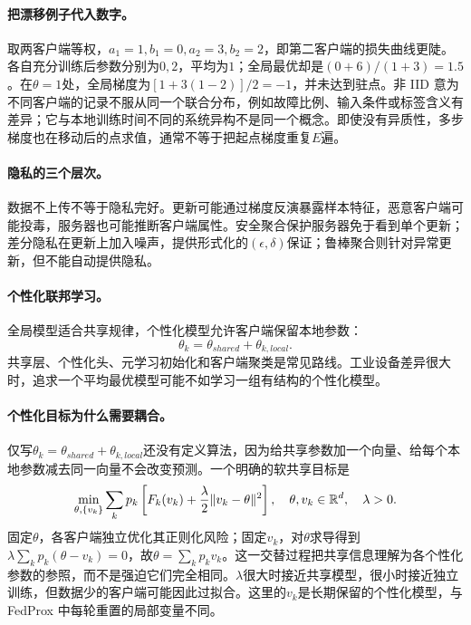 \paragraph{把漂移例子代入数字。}
取两客户端等权，$a_1=1,b_1=0,a_2=3,b_2=2$，即第二客户端的损失曲线更陡。各自充分训练后参数分别为$0,2$，平均为$1$；全局最优却是$(0+6)/(1+3)=1.5$。在$\theta=1$处，全局梯度为$[1+3(1-2)]/2=-1$，并未达到驻点。非 IID 意为不同客户端的记录不服从同一个联合分布，例如故障比例、输入条件或标签含义有差异；它与本地训练时间不同的系统异构不是同一个概念。即使没有异质性，多步梯度也在移动后的点求值，通常不等于把起点梯度重复$E$遍。

\paragraph{隐私的三个层次。}
数据不上传不等于隐私完好。更新可能通过梯度反演暴露样本特征，恶意客户端可能投毒，服务器也可能推断客户端属性。安全聚合保护服务器免于看到单个更新；差分隐私在更新上加入噪声，提供形式化的$(\epsilon,\delta)$保证；鲁棒聚合则针对异常更新，但不能自动提供隐私。

\paragraph{个性化联邦学习。}
全局模型适合共享规律，个性化模型允许客户端保留本地参数：
\begin{equation}
 \theta_k=\theta_{shared}+\theta_{k,local}.
\end{equation}
共享层、个性化头、元学习初始化和客户端聚类是常见路线。工业设备差异很大时，追求一个平均最优模型可能不如学习一组有结构的个性化模型。

\paragraph{个性化目标为什么需要耦合。}
仅写$\theta_k=\theta_{shared}+\theta_{k,local}$还没有定义算法，因为给共享参数加一个向量、给每个本地参数减去同一向量不会改变预测。一个明确的软共享目标是
\begin{equation}
 \min_{\theta,\{v_k\}}\sum_kp_k
 \left[F_k(v_k)+\frac\lambda2\|v_k-\theta\|^2\right],
 \quad \theta,v_k\in\mathbb{R}^d,\quad\lambda>0.
\end{equation}
固定$\theta$，各客户端独立优化其正则化风险；固定$v_k$，对$\theta$求导得到$\lambda\sum_kp_k(\theta-v_k)=0$，故$\theta=\sum_kp_kv_k$。这一交替过程把共享信息理解为各个性化参数的参照，而不是强迫它们完全相同。$\lambda$很大时接近共享模型，很小时接近独立训练，但数据少的客户端可能因此过拟合。这里的$v_k$是长期保留的个性化模型，与 FedProx 中每轮重置的局部变量不同。

